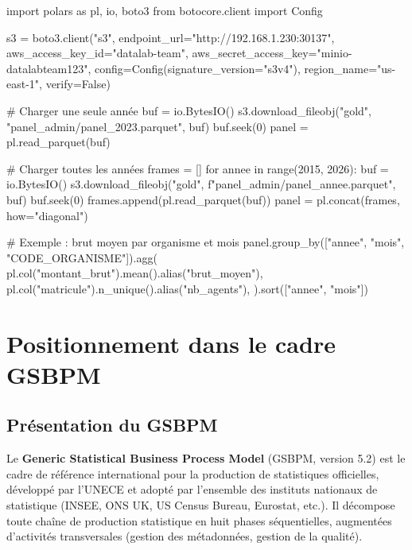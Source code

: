\documentclass[12pt,a4paper,french]{report}
\begin{document}
\begin{codebox}
import polars as pl, io, boto3
from botocore.client import Config

s3 = boto3.client("s3", endpoint\_url="http://192.168.1.230:30137",
                  aws\_access\_key\_id="datalab-team",
                  aws\_secret\_access\_key="minio-datalabteam123",
                  config=Config(signature\_version="s3v4"),
                  region\_name="us-east-1", verify=False)

# Charger une seule année
buf = io.BytesIO()
s3.download\_fileobj("gold", "panel\_admin/panel\_2023.parquet", buf)
buf.seek(0)
panel = pl.read\_parquet(buf)

# Charger toutes les années
frames = []
for annee in range(2015, 2026):
    buf = io.BytesIO()
    s3.download\_fileobj("gold", f"panel\_admin/panel\_{annee}.parquet", buf)
    buf.seek(0)
    frames.append(pl.read\_parquet(buf))
panel = pl.concat(frames, how="diagonal")

# Exemple : brut moyen par organisme et mois
panel.group\_by(["annee", "mois", "CODE\_ORGANISME"]).agg(
    pl.col("montant\_brut").mean().alias("brut\_moyen"),
    pl.col("matricule").n\_unique().alias("nb\_agents"),
).sort(["annee", "mois"])
\end{codebox}

\chapter{Positionnement dans le cadre GSBPM}

\section{Présentation du GSBPM}

Le \textbf{Generic Statistical Business Process Model} (GSBPM, version 5.2)
est le cadre de référence international pour la production de statistiques
officielles, développé par l'UNECE et adopté par l'ensemble des instituts
nationaux de statistique (INSEE, ONS UK, US Census Bureau, Eurostat, etc.).
Il décompose toute chaîne de production statistique en huit phases séquentielles,
augmentées d'activités transversales (gestion des métadonnées, gestion de la qualité).
\end{document}
